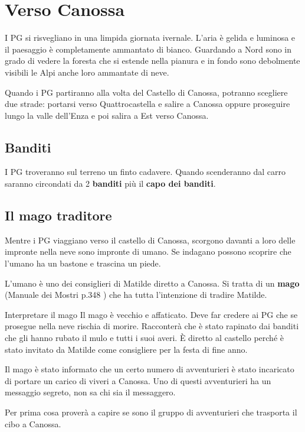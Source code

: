 \documentclass[letterpaper,twocolumn,openany,nodeprecatedcode]{dndbook}
\begin{document}
\chapter{Verso Canossa}
 I PG si risvegliano in una limpida giornata ivernale. L'aria è gelida e luminosa e il paesaggio è completamente ammantato di bianco. Guardando a Nord sono in grado di vedere la foresta che si estende nella pianura e in fondo sono debolmente visibili le Alpi anche loro ammantate di neve.

Quando i PG partiranno alla volta del Castello di Canossa, potranno scegliere due strade: portarsi verso Quattrocastella e salire a Canossa oppure proseguire lungo la valle dell'Enza e poi salira a Est verso Canossa.

\section{Banditi}
I PG troveranno sul terreno un finto cadavere. Quando scenderanno dal carro saranno circondati da 2 \textbf{banditi} più il \textbf{capo dei banditi}.

\section{Il mago traditore}
Mentre i PG viaggiano verso il castello di Canossa, scorgono davanti a loro delle impronte nella neve sono impronte di umano. Se indagano possono scoprire che l'umano ha un bastone e trascina un piede.

L'umano è uno dei consiglieri di Matilde diretto a Canossa. Si tratta di un \textbf{mago} (Manuale dei Mostri p.348 \cite{dnd:mostri}) che ha tutta l'intenzione di tradire Matilde. 

\begin{DndSidebar}{Interpretare il mago}
Il mago è vecchio e affaticato. Deve far credere ai PG che se prosegue nella neve rischia di morire. Racconterà che è stato rapinato dai banditi che gli hanno rubato il mulo e tutti i suoi averi. È diretto al castello perché è stato invitato da Matilde come consigliere per la festa di fine anno.
\end{DndSidebar}

Il mago è stato informato che un certo numero di avventurieri è stato incaricato di portare un carico di viveri a Canossa. Uno di questi avventurieri ha un messaggio segreto, non sa chi sia il messaggero.

Per prima cosa proverà a capire se sono il gruppo di avventurieri che trasporta il cibo a Canossa.
\end{document}
